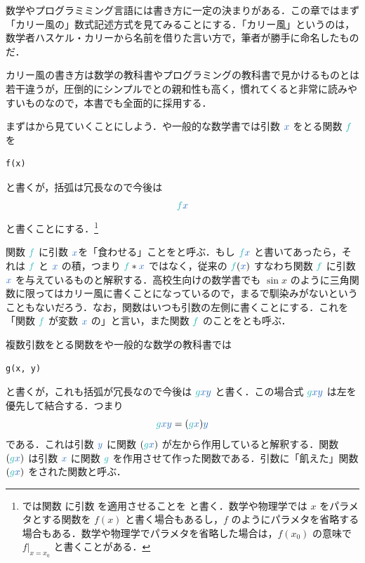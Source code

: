 \documentclass[a5paper,twoside,fleqn,draft]{jsbook}
\begin{document}
数学やプログラミミング言語には書き方に一定の決まりがある．この章ではまず「カリー風の」数式記述方式を見てみることにする．「カリー風」というのは，数学者ハスケル・カリーから名前を借りた言い方で，筆者が勝手に命名したものだ．

カリー風の書き方は数学の教科書やプログラミングの教科書で見かけるものとは若干違うが，圧倒的にシンプルで\haskell との親和性も高く，慣れてくると非常に読みやすいものなので，本書でも全面的に採用する．

まずはから見ていくことにしよう．\python や一般的な数学書では引数 $\hVar{x}$ をとる関数 $\hFunc{f}$ を
\begin{pythoncode}
\begin{verbatim}
f(x)
\end{verbatim}
\end{pythoncode}
と書くが，括弧は冗長なので今後は
\begin{equation}
  \hFunc{f}\hVar{x}
\end{equation}
と書くことにする．\footnote{\haskell では関数  に引数 を適用させることを  と書く．数学や物理学では $x$ をパラメタとする関数を $f(x)$ と書く場合もあるし，$f$ のようにパラメタを省略する場合もある．数学や物理学でパラメタを省略した場合は，$f(x_0)$ の意味で $f\vert_{x=x_0}$ と書くことがある．}


関数 $\hFunc{f}$ に引数 $\hVar{x}$を「食わせる」ことをと呼ぶ．もし $\hFunc{f}\hVar{x}$ と書いてあったら，それは $\hFunc{f}$ と $\hVar{x}$ の積，つまり $\hFunc{f}*\hVar{x}$ ではなく，従来の $\hFunc{f}(\hVar{x})$ すなわち関数 $\hFunc{f}$ に引数 $\hVar{x}$ を与えているものと解釈する．高校生向けの数学書でも $\sin x$ のように三角関数に限ってはカリー風に書くことになっているので，まるで馴染みがないということもないだろう．なお，関数はいつも引数の左側に書くことにする．これを「関数 $\hFunc{f}$ が変数 $\hVar{x}$ の」と言い，また関数 $\hFunc{f}$ のことをとも呼ぶ．

\separator

複数引数をとる関数を\python や一般的な数学の教科書では
\begin{pythoncode}
\begin{verbatim}
g(x, y)
\end{verbatim}
\end{pythoncode}
と書くが，これも括弧が冗長なので今後は $\hFunc{g}\hVar{x}\hVar{y}$ と書く．この場合式 $\hFunc{g}\hVar{x}\hVar{y}$ は左を優先して結合する．つまり
\begin{equation}
  \hFunc{g}\hVar{x}\hVar{y}=(\hFunc{g}\hVar{x})\hVar{y}
\end{equation}
である．これは引数 $\hVar{y}$ に関数 $(\hFunc{g}\hVar{x})$ が左から作用していると解釈する．関数 $(\hFunc{g}\hVar{x})$ は引数 $\hVar{x}$ に関数 $\hFunc{g}$ を作用させて作った関数である．引数に「飢えた」関数 $(\hFunc{g}\hVar{x})$ をされた関数と呼ぶ．
\end{document}
